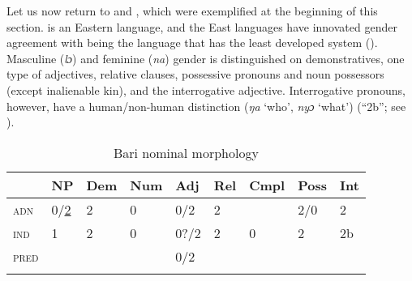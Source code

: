 \documentclass[output=collectionpaper]{langsci/langscibook}
\begin{document}
\newpage 
Let us now return to  and , which were exemplified at the beginning of this section.  is an Eastern  language, and the East  languages have innovated gender agreement with  being the language that has the least developed system (\citealt[257]{Heine1983}). Masculine (\textit{lɔ}) and feminine (\textit{na}) gender is distinguished on demonstratives, one type of adjectives, relative clauses, possessive pronouns and noun possessors (except inalienable kin), and the interrogative adjective. Interrogative pronouns, however, have a human/non-human distinction (\textit{ŋa} `who', \textit{nyɔ} `what') (``2b''; see ).

\begin{table}
\caption{Bari nominal morphology}
\begin{tabular}{>{\scshape}l*{8}{l}}
\lsptoprule
  &	NP	&	Dem	&	Num	&	Adj	&	Rel	&	Cmpl	&	Poss	&	Int	\\
\midrule
adn	&	0/\uline{2}	&	2	&	0	&	0/2	&	2	&		&	2/0	&	2	\\
ind	&	1	&	2	&	0	&	0?/2	&	2	&	0	&	2	&	2b	\\
pred	&		&		&		&	0/2	&		&		&		&		\\
\lspbottomrule
\end{tabular}
\label{tab:WDG:10}
\end{table}
\end{document}
